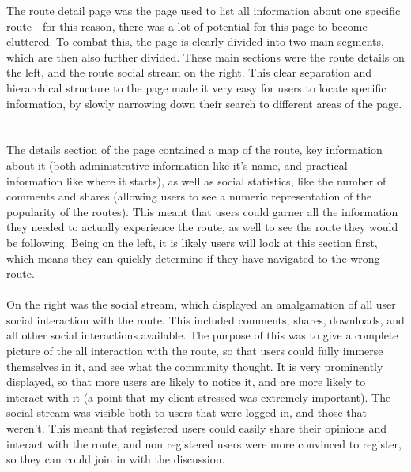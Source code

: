 \noindent
The route detail page was the page used to list all information about one specific route - for this reason, there was a lot of potential for this page to become cluttered. To combat this, the page is clearly divided into two main segments, which are then also further divided. These main sections were the route details on the left, and the route social stream on the right. This clear separation and hierarchical structure to the page made it very easy for users to locate specific information, by slowly narrowing down their search to different areas of the page. \ \\
\ \\
The details section of the page contained a map of the route, key information about it (both administrative information like it's name, and practical information like where it starts), as well as social statistics, like the number of comments and shares (allowing users to see a numeric representation of the popularity of the routes). This meant that users could garner all the information they needed to actually experience the route, as well to see the route they would be following. Being on the left, it is likely users will look at this section first, which means they can quickly determine if they have navigated to the wrong route.\ \\
\ \\
On the right was the social stream, which displayed an amalgamation of all user social interaction with the route. This included comments, shares, downloads, and all other social interactions available. The purpose of this was to give a complete picture of the all interaction with the route, so that users could fully immerse themselves in it, and see what the community thought. It is very prominently displayed, so that more users are likely to notice it, and are more likely to interact with it (a point that my client stressed was extremely important). The social stream was visible both to users that were logged in, and those that weren't. This meant that registered users could easily share their opinions and interact with the route, and non registered users were more convinced to register, so they can could join in with the discussion.

